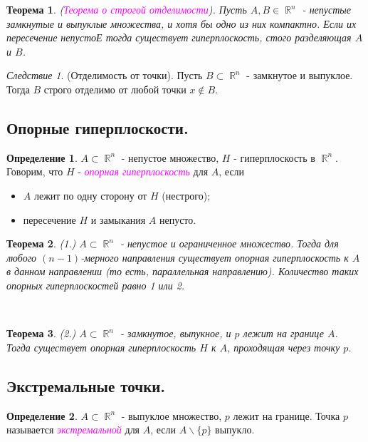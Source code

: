 \documentclass[a4paper,100pt]{article}
\theoremstyle{indented}
\newtheorem{theorem}{Теорема}
\theoremstyle{definition}
\newtheorem{defn}{Определение}
\theoremstyle{remark}
\newtheorem{cons}{Следствие}
\DeclareMathOperator{\RR}{\mathbb{R}}
\begin{document}
\begin{theorem}
    (\textit{\textcolor{magenta}{\hypertarget{s99}{Теорема о строгой отделимости}}}). Пусть $A, B \in \RR^n$ - непустые замкнутые и выпуклые множества, и хотя бы одно из них компактно. Если их пересечение непустоЕ тогда существует гиперплоскость, стого разделяющая $A$ и $B$. 
\end{theorem}

\begin{cons}
    (Отделимость от точки). Пусть $B \subset \RR^n$ - замкнутое и выпуклое. Тогда $B$ строго отделимо от любой точки $x \notin B$.
\end{cons}

\subsection{Опорные гиперплоскости.}

\begin{defn}
    $A \subset \RR^n$ - непустое множество, $H$ - гиперплоскость в $\RR^n$. Говорим, что $H$ - \textit{\textcolor{magenta}{\hypertarget{s100}{опорная гиперплоскость}}} для $A$, если

    \begin{itemize}
        \item $A$ лежит по одну сторону от $H$ (нестрого); 
        \item пересечение $H$ и замыкания $A$ непусто.
    \end{itemize}
\end{defn}

\begin{theorem}
    (1.) $A \subset \RR^n$ - непустое и ограниченное множество. Тогда для любого $(n-1)$-мерного направления существует опорная гиперплоскость к $A$ в данном направлении (то есть, параллельная направлению). Количество таких опорных гиперплоскостей равно 1 или 2.
\end{theorem} \

\begin{theorem}
    (2.) $A \subset \RR^n$ - замкнутое, выпукное, и $p$ лежит на границе $A$. Тогда существует опорная гиперплоскость $H$ к $A$, проходящая через точку $p$. 
\end{theorem}

\subsection{Экстремальные точки.}

\begin{defn}
    $A \subset \RR^n$ - выпуклое множество, $p$ лежит на границе. Точка $p$ называется \textit{\textcolor{magenta}{\hypertarget{s101}{экстремальной}}} для $A$, если $A \backslash \{p\}$ выпукло.
\end{defn}
\end{document}
